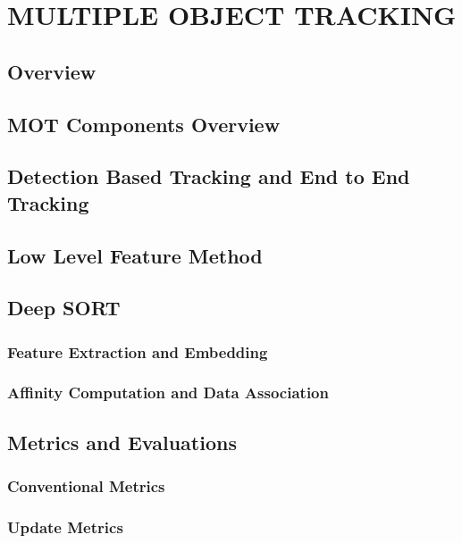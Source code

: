 \chapter{MULTIPLE OBJECT TRACKING}

\renewcommand{\headrulewidth}{0.5pt}
\renewcommand{\footrulewidth}{0.5pt}
\thispagestyle{plain}
\pagestyle{fancy}
\fancyhf{}
\raggedright
{}

\section{Overview}

\section{MOT Components Overview}

\section{Detection Based Tracking and End to End Tracking}

\section{Low Level Feature Method}

\section{Deep SORT}

    \subsection{Feature Extraction and Embedding}

    \subsection{Affinity Computation and Data Association}

\section{Metrics and Evaluations}

    \subsection{Conventional Metrics}

    \subsection{Update Metrics}